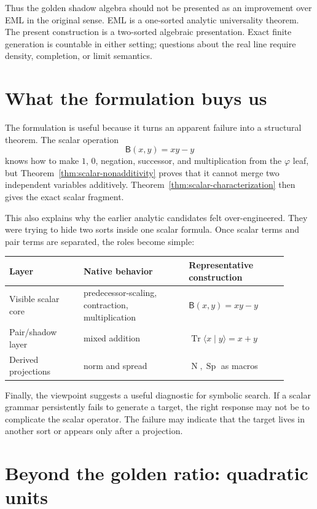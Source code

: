 \documentclass[11pt]{article}
\newcommand{\B}{\mathsf{B}}
\newcommand{\Tr}{\operatorname{Tr}}
\newcommand{\Nm}{\operatorname{N}}
\newcommand{\Sp}{\operatorname{Sp}}
\newcommand{\ph}{\varphi}
\begin{document}
Thus the golden shadow algebra should not be presented as an improvement over EML in the original sense.  EML is a one-sorted analytic universality theorem.  The present construction is a two-sorted algebraic presentation.  Exact finite generation is countable in either setting; questions about the real line require density, completion, or limit semantics.

\section{What the formulation buys us}

The formulation is useful because it turns an apparent failure into a structural theorem.  The scalar operation
\[
    \B(x,y)=xy-y
\]
knows how to make $1$, $0$, negation, successor, and multiplication from the $\ph$ leaf, but Theorem~\ref{thm:scalar-nonadditivity} proves that it cannot merge two independent variables additively.  Theorem~\ref{thm:scalar-characterization} then gives the exact scalar fragment.

This also explains why the earlier analytic candidates felt over-engineered.  They were trying to hide two sorts inside one scalar formula.  Once scalar terms and pair terms are separated, the roles become simple:
\begin{center}
\begin{tabular}{p{0.24\linewidth}p{0.34\linewidth}p{0.32\linewidth}}
\toprule
Layer & Native behavior & Representative construction \\
\midrule
Visible scalar core & predecessor-scaling, contraction, multiplication & $\B(x,y)=xy-y$ \\
Pair/shadow layer & mixed addition & $\Tr\langle x\mid y\rangle=x+y$ \\
Derived projections & norm and spread & $\Nm,\Sp$ as macros \\
\bottomrule
\end{tabular}
\end{center}

Finally, the viewpoint suggests a useful diagnostic for symbolic search.  If a scalar grammar persistently fails to generate a target, the right response may not be to complicate the scalar operator.  The failure may indicate that the target lives in another sort or appears only after a projection.

\section{Beyond the golden ratio: quadratic units}\label{sec:quadratic-units}
\end{document}
